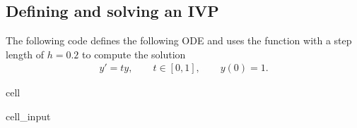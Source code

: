 \documentclass[letterpaper,10pt,english]{jupyterBook}
\begin{document}
\subsection{Defining and solving an IVP}
\label{\detokenize{8_Appendices/8.1_Python:defining-and-solving-an-ivp}}
\sphinxAtStartPar
The following code defines the following ODE and uses the  function with a step length of \(h=0.2\) to compute the solution
\begin{equation*}
\begin{split}y' = ty, \qquad t \in[0, 1], \qquad y(0) = 1.\end{split}
\end{equation*}
\begin{sphinxuseclass}{cell}\begin{sphinxVerbatimInput}

\begin{sphinxuseclass}{cell_input}
\begin{sphinxVerbatim}[commandchars=\\\{\}]
  
       

 
         


  \PYG{p}{[} \PYG{p}{]}  
  \PYG{p}{[}\PYG{p}{]}        
           

      


\end{sphinxVerbatim}
\end{sphinxuseclass}
\end{sphinxVerbatimInput}
\end{sphinxuseclass}
\end{document}
